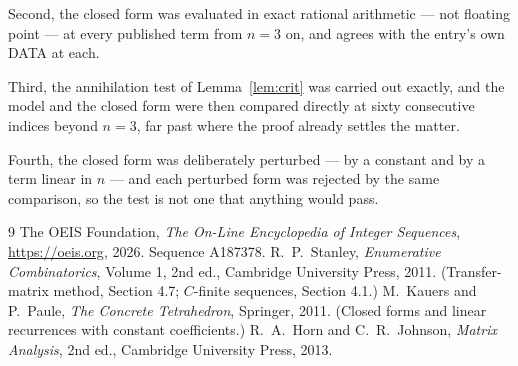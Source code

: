 \documentclass[11pt,a4paper]{article}
\theoremstyle{plain}
\theoremstyle{definition}
\begin{document}
Second, the closed form was evaluated in exact rational arithmetic --- not floating point ---
at every published term from $n=3$ on, and agrees with the entry's own DATA at each.

Third, the annihilation test of Lemma~\ref{lem:crit} was carried out exactly, and the model
and the closed form were then compared directly at sixty consecutive indices beyond
$n=3$, far past where the proof already settles the matter.

Fourth, the closed form was deliberately perturbed --- by a constant and by a term linear in
$n$ --- and each perturbed form was rejected by the same comparison, so the test is not one
that anything would pass.

\begin{thebibliography}{9}
 The OEIS Foundation, \emph{The On-Line Encyclopedia of Integer
Sequences}, \url{https://oeis.org}, 2026. Sequence A187378.
 R.~P.~Stanley, \emph{Enumerative Combinatorics}, Volume 1, 2nd ed.,
Cambridge University Press, 2011. (Transfer-matrix method, Section 4.7; $C$-finite sequences,
Section 4.1.)
 M.~Kauers and P.~Paule, \emph{The Concrete Tetrahedron}, Springer, 2011.
(Closed forms and linear recurrences with constant coefficients.)
 R.~A.~Horn and C.~R.~Johnson, \emph{Matrix Analysis}, 2nd ed., Cambridge
University Press, 2013.
\end{thebibliography}
\end{document}
